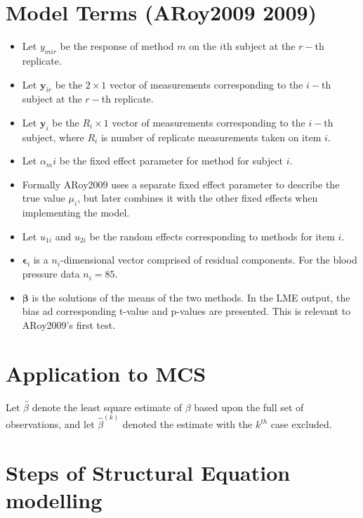 \documentclass[12pt, a4paper]{report}
\theoremstyle{plain}
\theoremstyle{definition}
\theoremstyle{remark}
\begin{document}
	\section{Model Terms (ARoy2009 2009)}
	\begin{itemize}
		\item Let $y_{mir}$ be the response of method $m$ on the $i$th subject
		at the $r-$th replicate.
		\item Let $\boldsymbol{y}_{ir}$ be the $2 \times 1$ vector of measurements
		corresponding to the $i-$th subject at the $r-$th replicate.
		\item Let $\boldsymbol{y}_{i}$ be the $R_i \times 1$ vector of
		measurements corresponding to the $i-$th subject, where $R_i$ is number of replicate measurements taken on item $i$.
		\item Let $\alpha_mi$ be the fixed effect parameter for method for subject $i$.
		\item Formally ARoy2009 uses a separate fixed effect parameter to describe the true value $\mu_i$, but later combines it with the other fixed effects when implementing the model.
		\item Let $u_{1i}$ and $u_{2i}$ be the random effects corresponding to methods for item $i$.
		
		\item $\boldsymbol{\epsilon}_{i}$ is a $n_{i}$-dimensional vector
		comprised of residual components. For the blood pressure data $n_{i} = 85$.
		
		\item $\boldsymbol{\beta}$ is the solutions of the means of the two methods. In the LME output, the bias ad corresponding
		t-value and p-values are presented. This is relevant to ARoy2009's first test.\end{itemize}
	
	
	
	\section{Application to MCS} %
	
	Let $\hat{\beta}$ denote the least square estimate of $\beta$
	based upon the full set of observations, and let
	$\hat{\beta}^{(k)}$ denoted the estimate with the $k^{th}$ case
	excluded.
	
	
	\section{Steps of Structural Equation modelling}
	
\end{document}
